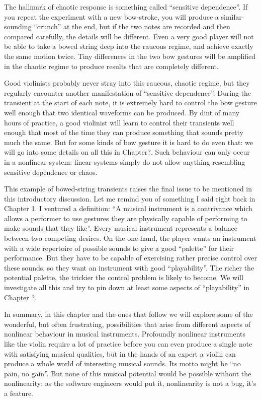   The hallmark of chaotic response is something called “sensitive dependence”. 
  If you repeat the experiment with a new bow-stroke, you will produce a 
  similar-sounding “crunch” at the end, but if the two notes are recorded and 
  then compared carefully, the details will be different. Even a very good 
  player will not be able to take a bowed string deep into the raucous regime, 
  and achieve exactly the same motion twice. Tiny differences in the two bow 
  gestures will be amplified in the chaotic regime to produce results that are 
  completely different. 

  Good violinists probably never stray into this raucous, chaotic regime, but 
  they regularly encounter another manifestation of “sensitive dependence”. 
  During the transient at the start of each note, it is extremely hard to 
  control the bow gesture well enough that two identical waveforms can be 
  produced. By dint of many hours of practice, a good violinist will learn to 
  control their transients well enough that most of the time they can produce 
  something that sounds pretty much the same. But for some kinds of bow gesture 
  it is hard to do even that: we will go into some details on all this in 
  Chapter?. Such behaviour can only occur in a nonlinear system: linear systems 
  simply do not allow anything resembling sensitive dependence or chaos. 

  This example of bowed-string transients raises the final issue to be 
  mentioned in this introductory discussion. Let me remind you of something I 
  said right back in Chapter 1. I ventured a definition: “A musical instrument 
  is a contrivance which allows a performer to use gestures they are physically 
  capable of performing to make sounds that they like”. Every musical 
  instrument represents a balance between two competing desires. On the one 
  hand, the player wants an instrument with a wide repertoire of possible 
  sounds to give a good “palette” for their performance. But they have to be 
  capable of exercising rather precise control over these sounds, so they want 
  an instrument with good “playability”. The richer the potential palette, the 
  trickier the control problem is likely to become. We will investigate all 
  this and try to pin down at least some aspects of ``playability'' in Chapter 
  ?. 

  In summary, in this chapter and the ones that follow we will explore some of 
  the wonderful, but often frustrating, possibilities that arise from different 
  aspects of nonlinear behaviour in musical instruments. Profoundly nonlinear 
  instruments like the violin require a lot of practice before you can even 
  produce a single note with satisfying musical qualities, but in the hands of 
  an expert a violin can produce a whole world of interesting musical sounds. 
  Its motto might be “no pain, no gain”. But none of this musical potential 
  would be possible without the nonlinearity: as the software engineers would 
  put it, nonlinearity is not a bug, it’s a feature. 

